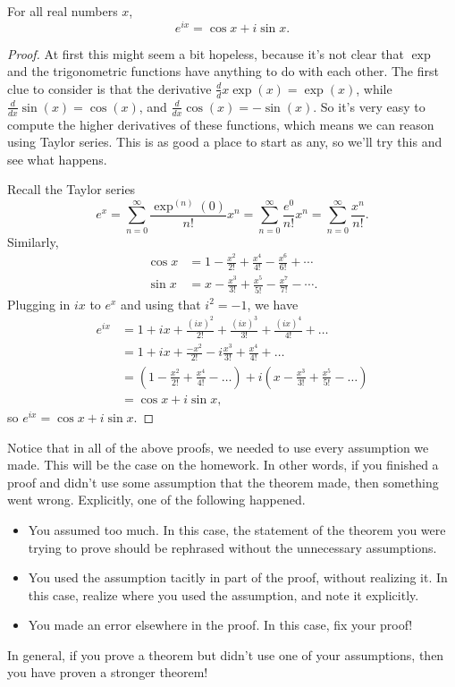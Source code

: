 \documentclass[../notes.tex]{subfiles}
\begin{document}
\begin{example}
    For all real numbers $x$,
    \[e^{ix} = \cos x + i \sin x.\]
\end{example}
\begin{proof}
    At first this might seem a bit hopeless, because it's not clear that $\exp$ and the trigonometric functions have anything to do with each other. The first clue to consider is that the derivative $\frac ddx\exp(x) = \exp(x)$, while $\frac d{dx}\sin(x) = \cos(x)$, and $\frac d{dx}\cos(x) = -\sin(x)$. So it's very easy to compute the higher derivatives of these functions, which means we can reason using Taylor series. This is as good a place to start as any, so we'll try this and see what happens.

    Recall the Taylor series
    \[e^x = \sum_{n=0}^\infty \frac{\exp^{(n)}(0)}{n!} x^n = \sum_{n=0}^\infty \frac{e^0}{n!} x^n = \sum_{n=0}^\infty \frac{x^n}{n!}.\]
    Similarly,
    \begin{align*}
        \cos x &= 1 - \frac{x^2}{2!} + \frac{x^4}{4!} - \frac{x^6}{6!} + \cdots \\
        \sin x &= x - \frac{x^3}{3!} + \frac{x^5}{5!} - \frac{x^7}{7!} - \cdots.
    \end{align*}
    Plugging in $ix$ to $e^x$ and using that $i^2 = -1$, we have
    \begin{align*}
        e^{ix} &= 1 + ix + \frac{(ix)^2}{2!} + \frac{(ix)^3}{3!} + \frac{(ix)^4}{4!} + \dots \\
        &= 1 + ix + \frac{-x^2}{2!} - i\frac{x^3}{3!} + \frac{x^4}{4!} + \dots\\
        &= \left(1 - \frac{x^2}{2!} + \frac{x^4}{4!} - \dots\right) + i\left(x - \frac{x^3}{3!} + \frac{x^5}{5!} - \dots\right)\\
        &= \cos x + i\sin x,
    \end{align*}
    so $e^{ix} = \cos x + i\sin x$.
\end{proof}
Notice that in all of the above proofs, we needed to use every assumption we made. This will be the case on the homework. In other words, if you finished a proof and didn't use some assumption that the theorem made, then something went wrong. Explicitly, one of the following happened.
\begin{itemize}
    \item You assumed too much. In this case, the statement of the theorem you were trying to prove should be rephrased without the unnecessary assumptions.
    \item You used the assumption tacitly in part of the proof, without realizing it. In this case, realize where you used the assumption, and note it explicitly.
    \item You made an error elsewhere in the proof. In this case, fix your proof!
\end{itemize}
In general, if you prove a theorem but didn't use one of your assumptions, then you have proven a stronger theorem!
\end{document}
